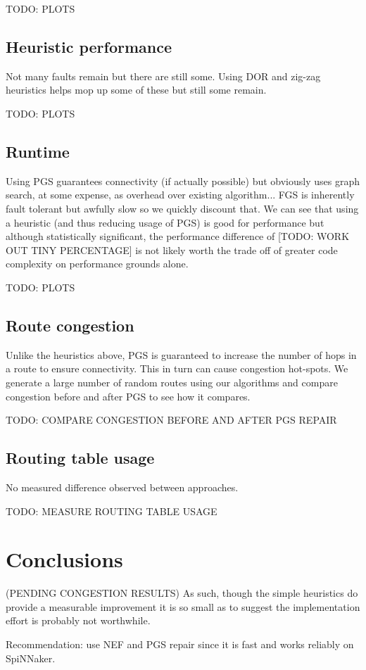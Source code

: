 			TODO: PLOTS
		
		\subsection{Heuristic performance}
			
			Not many faults remain but there are still some. Using DOR and zig-zag
			heuristics helps mop up some of these but still some remain.
			
			TODO: PLOTS
		
		\subsection{Runtime}
			
			Using PGS guarantees connectivity (if actually possible) but obviously
			uses graph search, at some expense, as overhead over existing
			algorithm... FGS is inherently fault tolerant but awfully slow so we
			quickly discount that. We can see that using a heuristic (and thus
			reducing usage of PGS) is good for performance but although
			statistically significant, the performance difference of [TODO: WORK OUT
			TINY PERCENTAGE] is not likely worth the trade off of greater code
			complexity on performance grounds alone.
			
			TODO: PLOTS
		
		\subsection{Route congestion}
			
			Unlike the heuristics above, PGS is guaranteed to increase the number
			of hops in a route to ensure connectivity. This in turn can cause
			congestion hot-spots. We generate a large number of random routes using
			our algorithms and compare congestion before and after PGS to see how
			it compares.
			
			TODO: COMPARE CONGESTION BEFORE AND AFTER PGS REPAIR
		
		\subsection{Routing table usage}
			
			No measured difference observed between approaches.
			
			TODO: MEASURE ROUTING TABLE USAGE
		
	\section{Conclusions}
		
		(PENDING CONGESTION RESULTS) As such, though the simple heuristics do
		provide a measurable improvement it is so small as to suggest the
		implementation effort is probably not worthwhile.
		
		Recommendation: use NEF and PGS repair since it is fast and works
		reliably on SpiNNaker.
